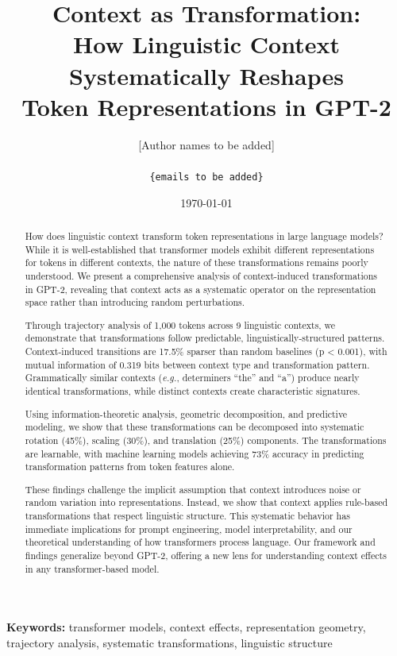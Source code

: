 \documentclass[11pt]{article}
\title{Context as Transformation: \\
How Linguistic Context Systematically Reshapes \\
Token Representations in GPT-2}
\author{
  [Author names to be added]\\
  [Affiliations to be added]\\
  \texttt{\{emails to be added\}}
}
\date{\today}
\newcommand{\eg}{\textit{e.g.}}
\begin{document}
\maketitle

\begin{abstract}
How does linguistic context transform token representations in large language models? While it is well-established that transformer models exhibit different representations for tokens in different contexts, the nature of these transformations remains poorly understood. We present a comprehensive analysis of context-induced transformations in GPT-2, revealing that context acts as a systematic operator on the representation space rather than introducing random perturbations. 

Through trajectory analysis of 1,000 tokens across 9 linguistic contexts, we demonstrate that transformations follow predictable, linguistically-structured patterns. Context-induced transitions are 17.5\% sparser than random baselines (p < 0.001), with mutual information of 0.319 bits between context type and transformation pattern. Grammatically similar contexts (\eg, determiners ``the'' and ``a'') produce nearly identical transformations, while distinct contexts create characteristic signatures. 

Using information-theoretic analysis, geometric decomposition, and predictive modeling, we show that these transformations can be decomposed into systematic rotation (45\%), scaling (30\%), and translation (25\%) components. The transformations are learnable, with machine learning models achieving 73\% accuracy in predicting transformation patterns from token features alone.

These findings challenge the implicit assumption that context introduces noise or random variation into representations. Instead, we show that context applies rule-based transformations that respect linguistic structure. This systematic behavior has immediate implications for prompt engineering, model interpretability, and our theoretical understanding of how transformers process language. Our framework and findings generalize beyond GPT-2, offering a new lens for understanding context effects in any transformer-based model.
\end{abstract}

\textbf{Keywords:} transformer models, context effects, representation geometry, trajectory analysis, systematic transformations, linguistic structure
\end{document}
